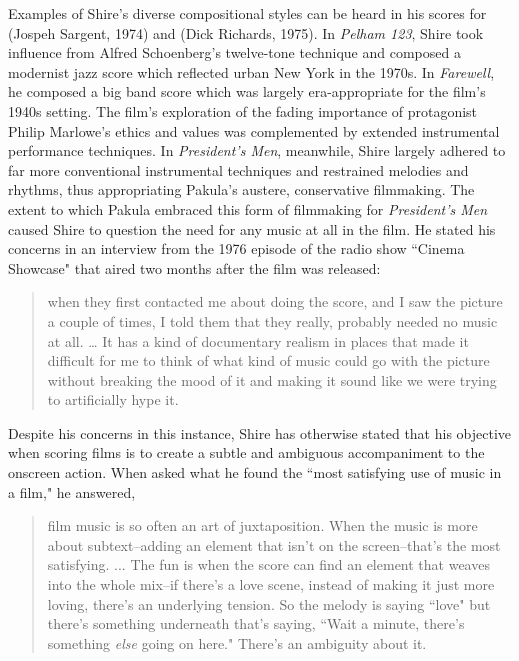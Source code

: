 Examples of Shire's diverse compositional styles can be heard in his scores for  (Jospeh Sargent, 1974) and  (Dick Richards, 1975).
In \textit{Pelham 123}, Shire took influence from Alfred Schoenberg's twelve-tone technique and composed a modernist jazz score which reflected urban New York in the 1970s.
In \textit{Farewell}, he composed a big band score which was largely era-appropriate for the film's 1940s setting.
The film's exploration of the fading importance of protagonist Philip Marlowe's ethics and values was complemented by extended instrumental performance techniques.
In \textit{President's Men}, meanwhile, Shire largely adhered to far more conventional instrumental techniques and restrained melodies and rhythms, thus appropriating Pakula's austere, conservative filmmaking.
The extent to which Pakula embraced this form of filmmaking for \textit{President's Men} caused Shire to question the need for any music at all in the film.
He stated his concerns in an interview from the 1976 episode of the radio show ``Cinema Showcase" that aired two months after the film was released:
\begin{quote}
when they first contacted me about doing the score, and I saw the picture a couple of times, I told them that they really, probably needed no music at all. … It has a kind of documentary realism in places that made it difficult for me to think of what kind of music could go with the picture without breaking the mood of it and making it sound like we were trying to artificially hype it.\autocites[][]{schwartz_cinema_1976}
\end{quote}
Despite his concerns in this instance, Shire has otherwise stated that his objective when scoring films is to create a subtle and ambiguous accompaniment to the onscreen action.
When asked what he found the ``most satisfying use of music in a film," he answered,
\begin{quote}    
film music is so often an art of juxtaposition. When the music is more about subtext–adding an element that isn't on the screen–that's the most satisfying. ... The fun is when the score can find an element that weaves into the whole mix–if there's a love scene, instead of making it just more loving, there's an underlying tension. So the melody is saying ``love" but there's something underneath that's saying, ``Wait a minute, there's something \textit{else} going on here." There's an ambiguity about it.\autocites[David Shire, quoted in][1]{morgan_knowing_2000}
\end{quote}
